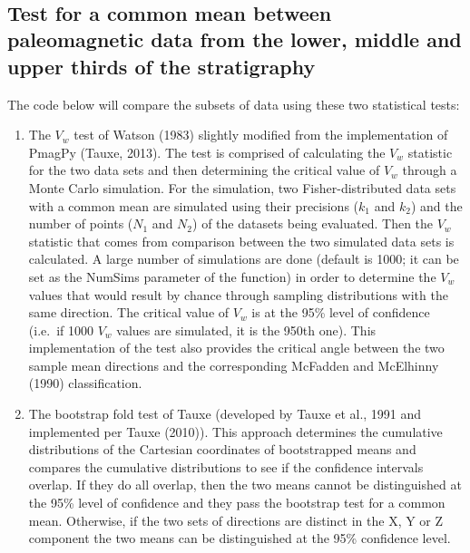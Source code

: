 \documentclass{article}
\begin{document}
    \begin{center}
    \end{center}
    { \hspace*{\fill} \\}
    

    \subsection{Test for a common mean between paleomagnetic data from the lower, middle
and upper thirds of the stratigraphy}


    The code below will compare the subsets of data using these two
statistical tests:

\begin{enumerate}
\def\labelenumi{\arabic{enumi}.}
\itemsep1pt\parskip0pt
\item
  The $V_w$ test of Watson (1983) slightly modified from the
  implementation of PmagPy (Tauxe, 2013). The test is comprised of
  calculating the $V_w$ statistic for the two data sets and then
  determining the critical value of $V_w$ through a Monte Carlo
  simulation. For the simulation, two Fisher-distributed data sets with
  a common mean are simulated using their precisions ($k_1$ and $k_2$)
  and the number of points ($N_1$ and $N_2$) of the datasets being
  evaluated. Then the $V_w$ statistic that comes from comparison between
  the two simulated data sets is calculated. A large number of
  simulations are done (default is 1000; it can be set as the NumSims
  parameter of the function) in order to determine the $V_w$ values that
  would result by chance through sampling distributions with the same
  direction. The critical value of $V_w$ is at the 95\% level of
  confidence (i.e.~if 1000 $V_w$ values are simulated, it is the 950th
  one). This implementation of the test also provides the critical angle
  between the two sample mean directions and the corresponding McFadden
  and McElhinny (1990) classification.
\item
  The bootstrap fold test of Tauxe (developed by Tauxe et al., 1991 and
  implemented per Tauxe (2010)). This approach determines the cumulative
  distributions of the Cartesian coordinates of bootstrapped means and
  compares the cumulative distributions to see if the confidence
  intervals overlap. If they do all overlap, then the two means cannot
  be distinguished at the 95\% level of confidence and they pass the
  bootstrap test for a common mean. Otherwise, if the two sets of
  directions are distinct in the X, Y or Z component the two means can
  be distinguished at the 95\% confidence level.
\end{enumerate}
\end{document}
